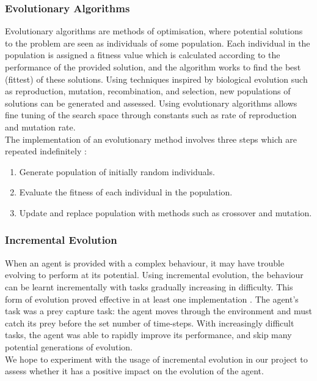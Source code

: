 \documentclass[12pt,a4paper]{article}
\begin{document}
\subsubsection{Evolutionary Algorithms}
Evolutionary algorithms are methods of optimisation, where potential solutions to the problem are seen as individuals of some population. Each individual in the population is assigned a fitness value which is calculated according to the performance of the provided solution, and the algorithm works to find the best (fittest) of these solutions. Using techniques inspired by biological evolution such as reproduction, mutation, recombination, and selection, new populations of solutions can be generated and assessed. Using evolutionary algorithms allows fine tuning of the search space through constants such as rate of reproduction and mutation rate. \cite{gas}\\

The implementation of an evolutionary method involves three steps which are repeated indefinitely \cite{ea}:
\begin{enumerate}
\item Generate population of initially random individuals.
\item Evaluate the fitness of each individual in the population.
\item Update and replace population with methods such as crossover and mutation.
\end{enumerate}
\newpage
\subsubsection{Incremental Evolution}
When an agent is provided with a complex behaviour, it may have trouble evolving to perform at its potential. Using incremental evolution, the behaviour can be learnt incrementally with tasks gradually increasing in difficulty. This form of evolution proved effective in at least one implementation \cite{incre}. The agent's task was a prey capture task: the agent moves through the environment and must catch its prey before the set number of time-steps. With increasingly difficult tasks, the agent was able to rapidly improve its performance, and skip many potential generations of evolution.\\

We hope to experiment with the usage of incremental evolution in our project to assess whether it has a positive impact on the evolution of the agent.\vspace{10mm}
\end{document}
